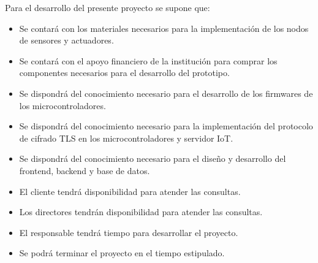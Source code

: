 Para el desarrollo del presente proyecto se supone que:

\begin{itemize}
	\item Se contará con los materiales necesarios para la implementación de los nodos de sensores y actuadores.
	\item Se contará con el apoyo financiero de la institución para comprar los componentes necesarios para el 
	desarrollo del prototipo.
	\item Se dispondrá del conocimiento necesario para el desarrollo de los firmwares de los microcontroladores.
	\item Se dispondrá del conocimiento necesario para la implementación del protocolo de cifrado TLS en los microcontroladores y servidor IoT.
	\item Se dispondrá del conocimiento necesario para el diseño y desarrollo del frontend, backend y base de datos.
	\item El cliente tendrá disponibilidad para atender las consultas.
	\item Los directores tendrán disponibilidad para atender las consultas.
	\item El responsable tendrá tiempo para desarrollar el proyecto.
	\item Se podrá terminar el proyecto en el tiempo estipulado.
\end{itemize}